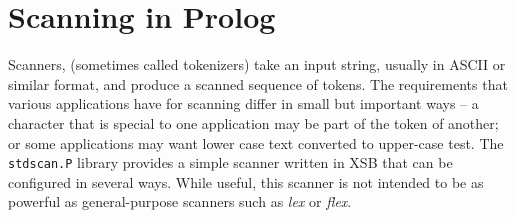 \section{Scanning in Prolog}

Scanners, (sometimes called tokenizers) take an input string, usually
in ASCII or similar format, and produce a scanned sequence of tokens.
The requirements that various applications have for scanning differ in
small but important ways -- a character that is special to one
application may be part of the token of another; or some applications
may want lower case text converted to upper-case test.  The {\tt
stdscan.P} library provides a simple scanner written in XSB that can
be configured in several ways.  While useful, this scanner is not
intended to be as powerful as general-purpose scanners such as {\em
lex} or {\em flex}.

